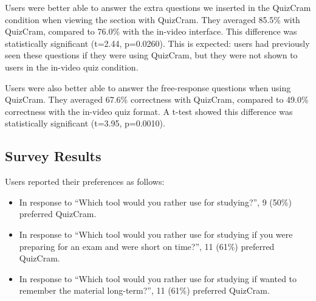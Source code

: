 \documentclass{sigchi}
\begin{document}

Users were better able to answer the extra questions we inserted in the QuizCram condition when viewing the section with QuizCram. They averaged 85.5\% with QuizCram, compared to 76.0\% with the in-video interface. This difference was statistically significant (t=2.44, p=0.0260). This is expected: users had previously seen these questions if they were using QuizCram, but they were not shown to users in the in-video quiz condition.

Users were also better able to answer the free-response questions when using QuizCram. They averaged 67.6\% correctness with QuizCram, compared to 49.0\% correctness with the in-video quiz format. A t-test showed this difference was statistically significant (t=3.95, p=0.0010). %


\subsection{Survey Results}

Users reported their preferences as follows:

\begin{itemize}
\item In response to ``Which tool would you rather use for studying?'', 9 (50\%) preferred QuizCram.
\item In response to ``Which tool would you rather use for studying if you were preparing for an exam and were short on time?'', 11 (61\%) preferred QuizCram.
\item In response to ``Which tool would you rather use for studying if wanted to remember the material long-term?'', 11 (61\%) preferred QuizCram.
\end{itemize}
\end{document}
